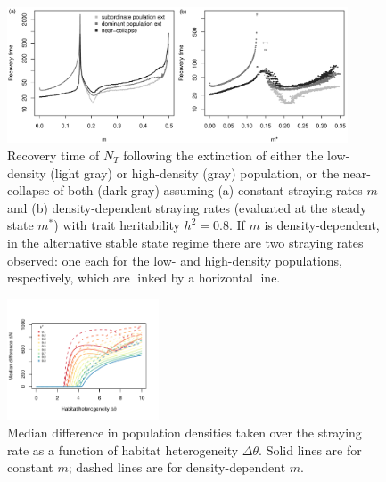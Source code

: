 \documentclass{revtex4}
\begin{document}
\begin{figure}
  \captionsetup{justification=raggedright,
singlelinecheck=false
}
\centering
\includegraphics[width=0.9\textwidth]{fig_relax_highh.pdf}
\caption{
Recovery time of $N_T$ following the extinction of either the low-density (light gray) or high-density (gray) population, or the near-collapse of both (dark gray) assuming (a) constant straying rates $m$ and (b) density-dependent straying rates (evaluated at the steady state $m^*$) with trait heritability $h^2=0.8$.
If $m$ is density-dependent, in the alternative stable state regime there are two straying rates observed: one each for the low- and high-density populations, respectively, which are linked by a horizontal line.
} \label{fig:relax_highh}
\end{figure}



\begin{figure}
  \captionsetup{justification=raggedright,
singlelinecheck=false
}
\centering
\includegraphics[width=0.4\textwidth]{fig_thetadiffN.pdf}
\caption{
Median difference in population densities taken over the straying rate as a function of habitat heterogeneity $\Delta\theta$.
Solid lines are for constant $m$; dashed lines are for density-dependent $m$.} \label{fig:thetadiffN}
\end{figure}
\end{document}
